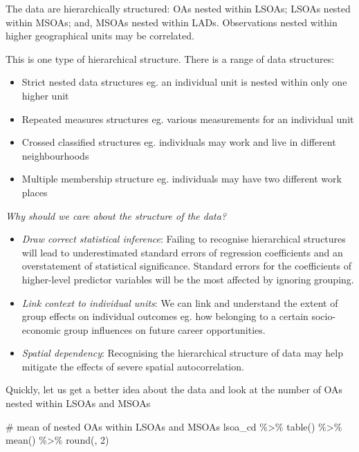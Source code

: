 \documentclass[
  letterpaper,
  DIV=11,
  numbers=noendperiod,
  oneside]{scrreprt}
\newenvironment{Shaded}{\begin{snugshade}}{\end{snugshade}}
\newcommand{\CommentTok}[1]{\textcolor[rgb]{0.37,0.37,0.37}{#1}}
\newcommand{\DecValTok}[1]{\textcolor[rgb]{0.68,0.00,0.00}{#1}}
\newcommand{\FunctionTok}[1]{\textcolor[rgb]{0.28,0.35,0.67}{#1}}
\newcommand{\NormalTok}[1]{\textcolor[rgb]{0.00,0.23,0.31}{#1}}
\newcommand{\SpecialCharTok}[1]{\textcolor[rgb]{0.37,0.37,0.37}{#1}}
\begin{document}
The data are hierarchically structured: OAs nested within LSOAs; LSOAs
nested within MSOAs; and, MSOAs nested within LADs. Observations nested
within higher geographical units may be correlated.

This is one type of hierarchical structure. There is a range of data
structures:

\begin{itemize}
\item
  Strict nested data structures eg. an individual unit is nested within
  only one higher unit
\item
  Repeated measures structures eg. various measurements for an
  individual unit
\item
  Crossed classified structures eg. individuals may work and live in
  different neighbourhoods
\item
  Multiple membership structure eg. individuals may have two different
  work places
\end{itemize}

\emph{Why should we care about the structure of the data?}

\begin{itemize}
\item
  \emph{Draw correct statistical inference}: Failing to recognise
  hierarchical structures will lead to underestimated standard errors of
  regression coefficients and an overstatement of statistical
  significance. Standard errors for the coefficients of higher-level
  predictor variables will be the most affected by ignoring grouping.
\item
  \emph{Link context to individual units}: We can link and understand
  the extent of group effects on individual outcomes eg. how belonging
  to a certain socio-economic group influences on future career
  opportunities.
\item
  \emph{Spatial dependency}: Recognising the hierarchical structure of
  data may help mitigate the effects of severe spatial autocorrelation.
\end{itemize}

Quickly, let us get a better idea about the data and look at the number
of OAs nested within LSOAs and MSOAs

\begin{Shaded}
\begin{Highlighting}[]
\CommentTok{\# mean of nested OAs within LSOAs and MSOAs}
\NormalTok{lsoa\_cd }\SpecialCharTok{\%\textgreater{}\%} \FunctionTok{table}\NormalTok{() }\SpecialCharTok{\%\textgreater{}\%}
  \FunctionTok{mean}\NormalTok{() }\SpecialCharTok{\%\textgreater{}\%}
  \FunctionTok{round}\NormalTok{(, }\DecValTok{2}\NormalTok{)}
\end{Highlighting}
\end{Shaded}
\end{document}
